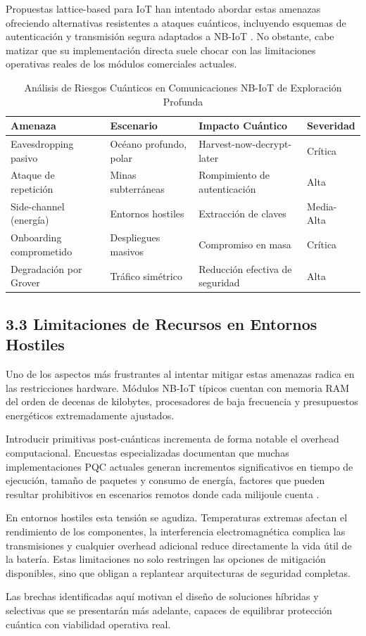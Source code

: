 Propuestas lattice-based para IoT han intentado abordar estas amenazas ofreciendo alternativas resistentes a ataques cuánticos, incluyendo esquemas de autenticación y transmisión segura adaptados a NB-IoT \cite{Althobaiti2021_QuantumResistant}. No obstante, cabe matizar que su implementación directa suele chocar con las limitaciones operativas reales de los módulos comerciales actuales.

\begin{table}[t]
\centering
\caption{Análisis de Riesgos Cuánticos en Comunicaciones NB-IoT de Exploración Profunda}
\label{tab:riesgos}
\begin{tabular}{|l|l|l|l|}
\hline
\textbf{Amenaza} & \textbf{Escenario} & \textbf{Impacto Cuántico} & \textbf{Severidad} \\
\hline
Eavesdropping pasivo & Océano profundo, polar & Harvest-now-decrypt-later & Crítica \\
\hline
Ataque de repetición & Minas subterráneas & Rompimiento de autenticación & Alta \\
\hline
Side-channel (energía) & Entornos hostiles & Extracción de claves & Media-Alta \\
\hline
Onboarding comprometido & Despliegues masivos & Compromiso en masa & Crítica \\
\hline
Degradación por Grover & Tráfico simétrico & Reducción efectiva de seguridad & Alta \\
\hline
\end{tabular}
\end{table}

\subsection{3.3 Limitaciones de Recursos en Entornos Hostiles}

Uno de los aspectos más frustrantes al intentar mitigar estas amenazas radica en las restricciones hardware. Módulos NB-IoT típicos cuentan con memoria RAM del orden de decenas de kilobytes, procesadores de baja frecuencia y presupuestos energéticos extremadamente ajustados. 

Introducir primitivas post-cuánticas incrementa de forma notable el overhead computacional. Encuestas especializadas documentan que muchas implementaciones PQC actuales generan incrementos significativos en tiempo de ejecución, tamaño de paquetes y consumo de energía, factores que pueden resultar prohibitivos en escenarios remotos donde cada milijoule cuenta \cite{Liu2024_PQC_IoT}.

En entornos hostiles esta tensión se agudiza. Temperaturas extremas afectan el rendimiento de los componentes, la interferencia electromagnética complica las transmisiones y cualquier overhead adicional reduce directamente la vida útil de la batería. Estas limitaciones no solo restringen las opciones de mitigación disponibles, sino que obligan a replantear arquitecturas de seguridad completas. 

Las brechas identificadas aquí motivan el diseño de soluciones híbridas y selectivas que se presentarán más adelante, capaces de equilibrar protección cuántica con viabilidad operativa real.